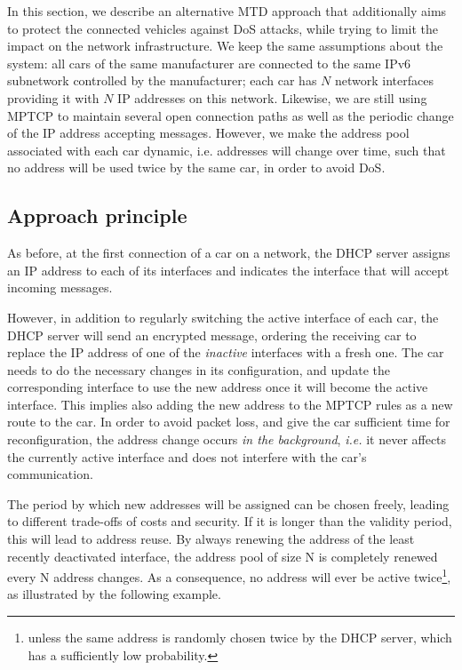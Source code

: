 \label{sec:second}

{\Huge I}n this section, we describe an alternative MTD approach that
additionally aims to protect the connected vehicles against DoS
attacks, while trying to limit the impact on the network
infrastructure. We keep the same assumptions about the system: all
cars of the same manufacturer are connected to the same IPv6
subnetwork controlled by the manufacturer; each car has $N$ network
interfaces providing it with $N$ IP addresses on this
network. Likewise, we are still using MPTCP to maintain several open
connection paths as well as the periodic change of the IP address
accepting messages. However, we make the address pool associated with
each car dynamic, i.e. addresses will change over time, such that no
address will be used twice by the same car, in order to avoid DoS.


\subsection{Approach principle}


As before, at the first connection of a car on a network, the DHCP
server assigns an IP address to each of its interfaces and indicates
the interface that will accept incoming messages.

However, in addition to regularly switching the active interface of
each car, the DHCP server will send an encrypted message, ordering the
receiving car to replace the IP address of one of the \emph{inactive}
interfaces with a fresh one. The car needs to do the necessary changes
in its configuration, and update the corresponding interface to use
the new address once it will become the active interface. This implies
also adding the new address to the MPTCP rules as a new route to the
car. In order to avoid packet loss, and give the car sufficient time
for reconfiguration, the address change occurs \emph{in the
background}, \emph{i.e.} it never affects the currently active interface and
does not interfere with the car's communication.

The period by which new addresses will be assigned can be chosen freely, leading
to different trade-offs of costs and security. If it is longer than the validity
period, this will lead to address reuse. By always renewing the address of the
least recently deactivated interface, the address pool of size N is completely
renewed every N address changes. As a consequence, no address will ever be
active twice\footnote{unless the same address is randomly chosen twice by the
DHCP server, which has a sufficiently low probability.}, as illustrated by the
following example.

